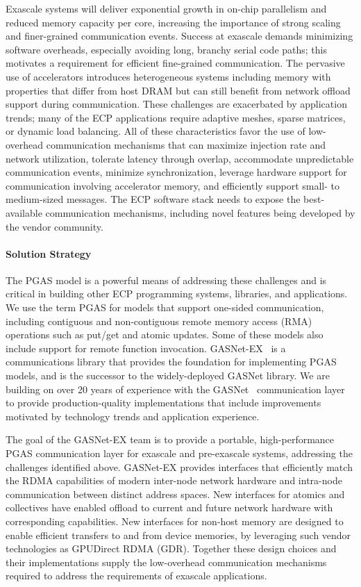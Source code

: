 Exascale systems will deliver exponential growth in on-chip parallelism and
reduced memory capacity per core, 
increasing the importance of strong
scaling and finer-grained communication events.  
Success at exascale demands minimizing software overheads,
especially avoiding long, branchy serial code paths; 
this motivates a requirement for efficient
fine-grained communication.
The pervasive use of accelerators introduces heterogeneous systems including
memory with properties that differ from host DRAM but can still benefit from
network offload support during communication.
These challenges are exacerbated by application trends; many of the ECP applications require
adaptive meshes, sparse matrices,
or dynamic load balancing.
All of these characteristics favor the use of
low-overhead communication mechanisms that
can maximize injection rate and network utilization, tolerate latency through
overlap, accommodate unpredictable communication events, minimize synchronization,
leverage hardware support for communication involving accelerator memory,
and efficiently support small- to medium-sized messages. The ECP software stack
needs to expose the best-available communication mechanisms, including novel
features being developed by the vendor community.

\paragraph{Solution Strategy}

The PGAS model is a powerful means of addressing these
challenges and is critical in building other ECP programming systems,
libraries, and applications.  We use the term PGAS for models that support
one-sided communication, 
including contiguous and non-contiguous remote memory access (RMA) operations such as put/get
and atomic updates. Some of these models also include support for remote function invocation.
GASNet-EX~\cite{gasnet-lcpc18} is a communications library that provides the foundation for implementing
PGAS models, and is the successor to the widely-deployed GASNet library.
We are building on over 20 years of experience with the GASNet~\cite{gasnet-site,gasnet-spec}
communication layer to provide production-quality implementations that include
improvements motivated by
technology trends and application experience.  

The goal of the GASNet-EX team is to provide a portable, high-performance PGAS
communication layer for exascale and pre-exascale systems, addressing the challenges
identified above.
GASNet-EX provides interfaces that efficiently match the RDMA capabilities of modern
inter-node network hardware and intra-node communication between distinct address spaces.
New interfaces for atomics and collectives have enabled offload to current
and future network hardware with corresponding capabilities.
New interfaces for non-host memory are designed to enable efficient transfers
to and from device memories, by leveraging such vendor technologies as
GPUDirect RDMA (GDR).
Together these design choices and their implementations supply the low-overhead communication
mechanisms required to address the requirements of exascale applications.

